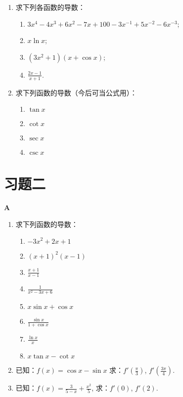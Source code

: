 \begin{ex}
\begin{enumerate}
    \item 求下列各函数的导数：
\begin{enumerate}[(1)]
    \item $3x^4-4x^3+6x^2-7x+100-3x^{-1}+5x^{-2}-6x^{-3}$;
    \item $x\ln x$;
    \item $(3x^2+1)(x+\cos x)$;
    \item $\frac{2x-1}{x+1}$.
\end{enumerate}
    \item 求下列函数的导数（今后可当公式用）：
\begin{multicols}{2}
\begin{enumerate}[(1)]
    \item $\tan x$
    \item $\cot x$
    \item $\sec x$
    \item $\csc x$
\end{enumerate}
\end{multicols}
\end{enumerate}
\end{ex}

\section*{习题二}
\begin{center}
    \bfseries A
\end{center}

\begin{enumerate}
    \item 求下列函数的导数：
\begin{multicols}{2}
\begin{enumerate}[(1)]
    \item $- 3x^{2}+ 2x+ 1$
    \item $( x+ 1) ^{2}( x- 1)$
    \item $\frac{x+1}{x-1}$
    \item $\frac{1}{x^{2}-3x+6}$
    \item $x\sin x+\cos x$
    \item $\frac{\sin x}{1+\cos x}$
    \item $\frac{\ln x}{x}$
    \item $x\tan x-\cot x$
\end{enumerate}    
\end{multicols}
\item 已知：$f(x)=\cos x-\sin x$ 求：$f' \left(\frac\pi3\right)$, $f' \left(\frac{3\pi}4\right)$.
\item 已知：$f(x)=\frac{3}{5-x}+\frac{x^{2}}{5}$, 求：$f' (0)$, $f' (2)$.
\end{enumerate}

